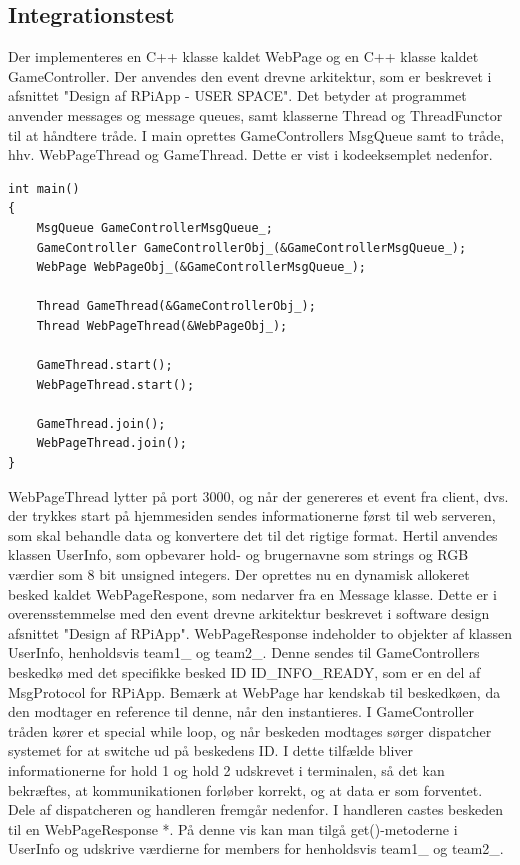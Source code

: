 \documentclass[Integrationstest/Integrationstest_main.tex]{subfiles}
\begin{document}
\subsection{Integrationstest}
Der implementeres en C++ klasse kaldet WebPage og en C++ klasse kaldet GameController. Der anvendes den event drevne arkitektur, som er beskrevet i afsnittet "Design af RPiApp - USER SPACE". Det betyder at programmet anvender messages og message queues, samt klasserne Thread og ThreadFunctor til at håndtere tråde. I main oprettes GameControllers MsgQueue samt to tråde, hhv. WebPageThread og GameThread. Dette er vist i kodeeksemplet nedenfor.
\begin{lstlisting}
int main()
{
    MsgQueue GameControllerMsgQueue_;
    GameController GameControllerObj_(&GameControllerMsgQueue_);
    WebPage WebPageObj_(&GameControllerMsgQueue_);

    Thread GameThread(&GameControllerObj_);
    Thread WebPageThread(&WebPageObj_);

    GameThread.start();
    WebPageThread.start();
	
    GameThread.join();
    WebPageThread.join();
}
\end{lstlisting}
WebPageThread lytter på port 3000, og når der genereres et event fra client, dvs. der trykkes start på hjemmesiden sendes informationerne først til web serveren, som skal behandle data og konvertere det til det rigtige format. Hertil anvendes klassen UserInfo, som opbevarer hold- og brugernavne som strings og RGB værdier som 8 bit unsigned integers. Der oprettes nu en dynamisk allokeret besked kaldet WebPageRespone, som nedarver fra en Message klasse. Dette er i overensstemmelse med den event drevne arkitektur beskrevet i software design afsnittet "Design af RPiApp". WebPageResponse indeholder to objekter af klassen UserInfo, henholdsvis team1\_ og team2\_.  
Denne sendes til GameControllers beskedkø med det specifikke besked ID ID\_INFO\_READY, som er en del af MsgProtocol for RPiApp. Bemærk at WebPage har kendskab til beskedkøen, da den modtager en reference til denne, når den instantieres. I GameController tråden kører et special while loop, og når beskeden modtages sørger dispatcher systemet for at switche ud på beskedens ID. I dette tilfælde bliver informationerne for hold 1 og hold 2 udskrevet i terminalen, så det kan bekræftes, at kommunikationen forløber korrekt, og at data er som forventet. Dele af dispatcheren og handleren fremgår nedenfor. I handleren castes beskeden til en WebPageResponse *. På denne vis kan man tilgå get()-metoderne i UserInfo og udskrive værdierne for members for henholdsvis team1\_ og team2\_.
\end{document}
